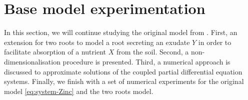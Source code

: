 \documentclass[11pt]{article}
\numberwithin{equation}{section}
\begin{document}
\newpage

\section{Base model experimentation}
\label{sec:Base}


In this section, we will continue studying the original model from \cite{Ptashnyk-2011}. First, an extension for two roots to model a root secreting an exudate $Y$ in order to facilitate absorption of a nutrient $X$ from the soil. Second, a non-dimensionalisation procedure is presented. Third, a numerical approach is discussed to approximate solutions of the coupled partial differential equation systems. Finally, we finish with a set of numerical experiments for the original model \eqref{eq:system-Zinc} and the two roots model.

\end{document}
